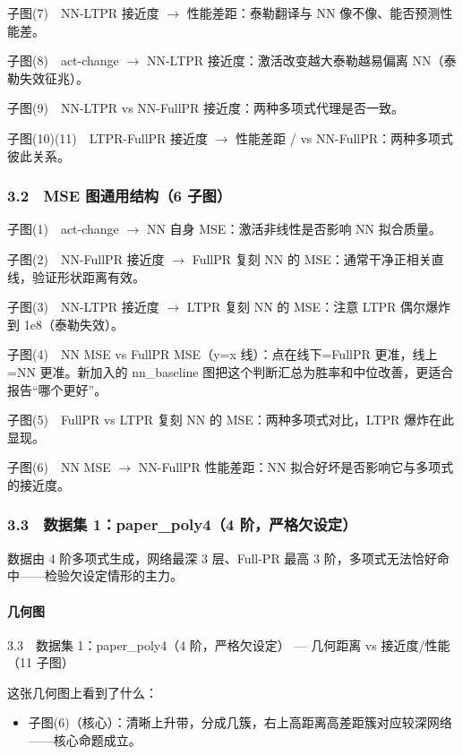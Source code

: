 \documentclass[UTF8,a4paper,11pt]{ctexart}
\begin{document}
子图(7)　NN-LTPR 接近度 $\to$ 性能差距：泰勒翻译与 NN 像不像、能否预测性能差。

子图(8)　act-change $\to$ NN-LTPR 接近度：激活改变越大泰勒越易偏离 NN（泰勒失效征兆）。

子图(9)　NN-LTPR vs NN-FullPR 接近度：两种多项式代理是否一致。

子图(10)(11)　LTPR-FullPR 接近度 $\to$ 性能差距 / vs NN-FullPR：两种多项式彼此关系。

\subsubsection{3.2　MSE 图通用结构（6 子图）}

子图(1)　act-change $\to$ NN 自身 MSE：激活非线性是否影响 NN 拟合质量。

子图(2)　NN-FullPR 接近度 $\to$ FullPR 复刻 NN 的 MSE：通常干净正相关直线，验证形状距离有效。

子图(3)　NN-LTPR 接近度 $\to$ LTPR 复刻 NN 的 MSE：注意 LTPR 偶尔爆炸到 1e8（泰勒失效）。

子图(4)　NN MSE vs FullPR MSE（y=x 线）：点在线下=FullPR 更准，线上=NN 更准。新加入的 nn\_baseline 图把这个判断汇总为胜率和中位改善，更适合报告“哪个更好”。

子图(5)　FullPR vs LTPR 复刻 NN 的 MSE：两种多项式对比，LTPR 爆炸在此显现。

子图(6)　NN MSE $\to$ NN-FullPR 性能差距：NN 拟合好坏是否影响它与多项式的接近度。

\subsubsection{3.3　数据集 1：paper\_poly4（4 阶，严格欠设定）}

数据由 4 阶多项式生成，网络最深 3 层、Full-PR 最高 3 阶，多项式无法恰好命中------检验欠设定情形的主力。

\paragraph{几何图}

3.3　数据集 1：paper\_poly4（4 阶，严格欠设定） --- 几何距离 vs 接近度/性能（11 子图）

这张几何图上看到了什么：

\begin{itemize}
\item 子图(6)（核心）：清晰上升带，分成几簇，右上高距离高差距簇对应较深网络------核心命题成立。
\end{itemize}
\end{document}
